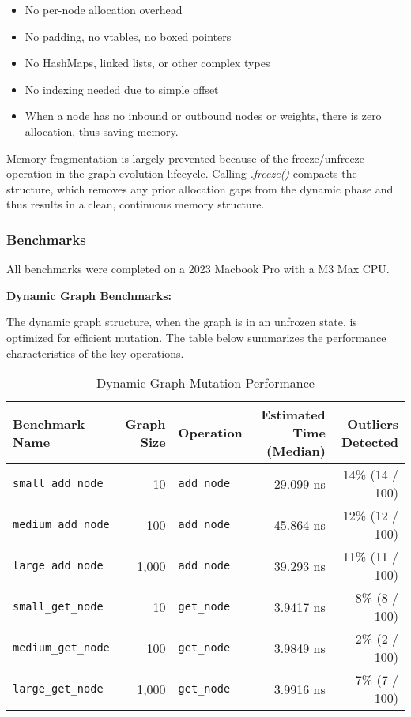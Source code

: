 \begin{itemize}
	\item No per-node allocation overhead
	\item No padding, no vtables, no boxed pointers
	\item No HashMaps, linked lists, or other complex types
	\item No indexing needed due to simple offset\
	\item When a node has no inbound or outbound nodes or weights, there is zero allocation, thus saving memory.
\end{itemize}


Memory fragmentation is largely prevented because of the freeze/unfreeze operation in the graph evolution lifecycle. Calling \textit{.freeze()} compacts the structure, which removes any prior allocation gaps from the dynamic phase and thus results in a clean, continuous memory structure.

\subsubsection{Benchmarks}

All benchmarks were completed on a 2023 Macbook Pro with a M3 Max CPU.

\textbf{Dynamic Graph Benchmarks:}

The dynamic graph structure, when the graph is in an unfrozen state, is optimized for efficient mutation. The table below summarizes the performance characteristics of the key operations.

\begin{table}[h!]
\centering
\caption{Dynamic Graph Mutation Performance}
\label{tab:dynamic-graph-perf}
\begin{tabular}{lrlrr}
\toprule
\textbf{Benchmark Name} & \textbf{Graph Size} & \textbf{Operation} & \textbf{Estimated Time (Median)} & \textbf{Outliers Detected} \\
\midrule
\texttt{small\_add\_node}  & 10    & \texttt{add\_node} & 29.099 ns & 14\% (14 / 100) \\
\texttt{medium\_add\_node} & 100   & \texttt{add\_node} & 45.864 ns & 12\% (12 / 100) \\
\texttt{large\_add\_node}  & 1,000 & \texttt{add\_node} & 39.293 ns & 11\% (11 / 100) \\
\texttt{small\_get\_node}  & 10    & \texttt{get\_node} & 3.9417 ns & 8\% (8 / 100)  \\
\texttt{medium\_get\_node} & 100   & \texttt{get\_node} & 3.9849 ns & 2\% (2 / 100)  \\
\texttt{large\_get\_node}  & 1,000 & \texttt{get\_node} & 3.9916 ns & 7\% (7 / 100)  \\
\bottomrule
\end{tabular}
\end{table}

